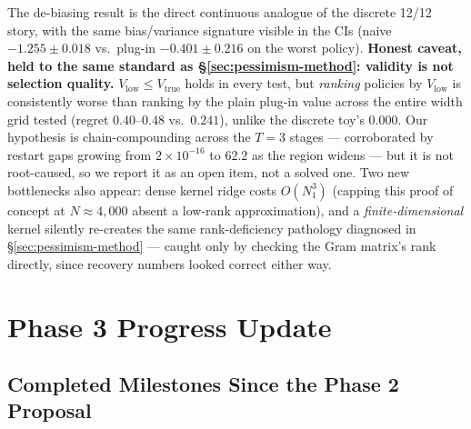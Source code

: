 \documentclass[11pt]{article}
\begin{document}
\noindent The de-biasing result is the direct continuous analogue of the discrete 12/12
story, with the same bias/variance signature visible in the CIs (naive $-1.255 \pm 0.018$
vs.\ plug-in $-0.401 \pm 0.216$ on the worst policy). \textbf{Honest caveat, held to the
same standard as \S\ref{sec:pessimism-method}: validity is not selection quality.}
$V_{\mathrm{low}} \le V_{\mathrm{true}}$ holds in every test, but \emph{ranking} policies by
$V_{\mathrm{low}}$ is consistently worse than ranking by the plain plug-in value across the
entire width grid tested (regret $0.40$--$0.48$ vs.\ $0.241$), unlike the discrete toy's
$0.000$. Our hypothesis is chain-compounding across the $T{=}3$ stages --- corroborated by
restart gaps growing from $2\times10^{-16}$ to $62.2$ as the region widens --- but it is not
root-caused, so we report it as an open item, not a solved one. Two new bottlenecks also
appear: dense kernel ridge costs $O(N_1^3)$ (capping this proof of concept at $N\approx
4{,}000$ absent a low-rank approximation), and a \emph{finite-dimensional} kernel silently
re-creates the same rank-deficiency pathology diagnosed in
\S\ref{sec:pessimism-method} --- caught only by checking the Gram matrix's rank directly,
since recovery numbers looked correct either way.

\section{Phase 3 Progress Update}
\label{sec:phase3}

\subsection{Completed Milestones Since the Phase 2 Proposal}
\end{document}
